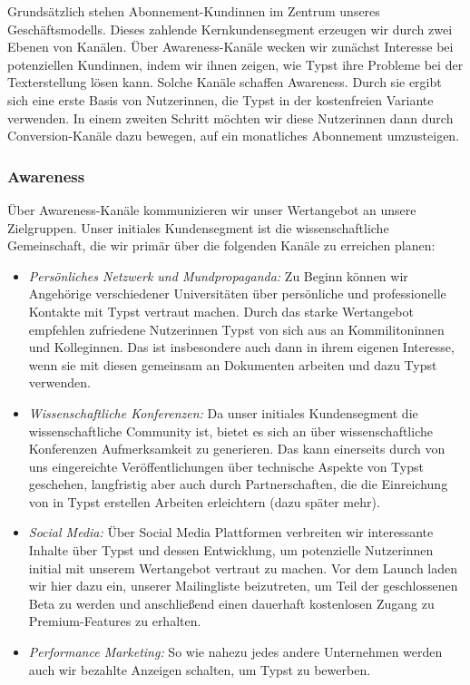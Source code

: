 \documentclass[11pt, a4paper]{article}
\newcommand{\gender}{\raisebox{-.25em}{*}}
\begin{document}
Grundsätzlich stehen Abonnement-Kund\gender{}innen im Zentrum unseres Geschäftsmodells. Dieses zahlende Kernkundensegment erzeugen wir durch zwei Ebenen von Kanälen. Über Awareness-Kanäle wecken wir zunächst Interesse bei potenziellen Kund\gender{}innen, indem wir ihnen zeigen, wie Typst ihre Probleme bei der Texterstellung lösen kann. Solche Kanäle schaffen Awareness. Durch sie ergibt sich eine erste Basis von Nutzer\gender{}innen, die Typst in der kostenfreien Variante verwenden. In einem zweiten Schritt möchten wir diese Nutzer\gender{}innen dann durch Conversion-Kanäle dazu bewegen, auf ein monatliches Abonnement umzusteigen.

\subsubsection*{Awareness}

Über Awareness-Kanäle kommunizieren wir unser Wertangebot an unsere Zielgruppen. Unser initiales Kundensegment ist die wissenschaftliche Gemeinschaft, die wir primär über die folgenden Kanäle zu erreichen planen:

\begin{itemize}
    \item \emph{Persönliches Netzwerk und Mundpropaganda:} Zu Beginn können wir Angehörige verschiedener Universitäten über persönliche und professionelle Kontakte mit Typst vertraut machen. Durch das starke Wertangebot empfehlen zufriedene Nutzer\gender{}innen Typst von sich aus an Kommiliton\gender{}innen und Kolleg\gender{}innen. Das ist insbesondere auch dann in ihrem eigenen Interesse, wenn sie mit diesen gemeinsam an Dokumenten arbeiten und dazu Typst verwenden.
    \item \emph{Wissenschaftliche Konferenzen:} Da unser initiales Kundensegment die wissenschaftliche Community ist, bietet es sich an über wissenschaftliche Konferenzen Aufmerksamkeit zu generieren. Das kann einerseits durch von uns eingereichte Veröffentlichungen über technische Aspekte von Typst geschehen, langfristig aber auch durch Partnerschaften, die die Einreichung von in Typst erstellen Arbeiten erleichtern (dazu später mehr).
    \item \emph{Social Media:} Über Social Media Plattformen verbreiten wir interessante Inhalte über Typst und dessen Entwicklung, um potenzielle Nutzer\gender{}innen initial mit unserem Wertangebot vertraut zu machen. Vor dem Launch laden wir hier dazu ein, unserer Mailingliste beizutreten, um Teil der geschlossenen Beta zu werden und anschließend einen dauerhaft kostenlosen Zugang zu Premium-Features zu erhalten.
    \item \emph{Performance Marketing:} So wie nahezu jedes andere Unternehmen werden auch wir bezahlte Anzeigen schalten, um Typst zu bewerben. 
\end{itemize}
\end{document}

